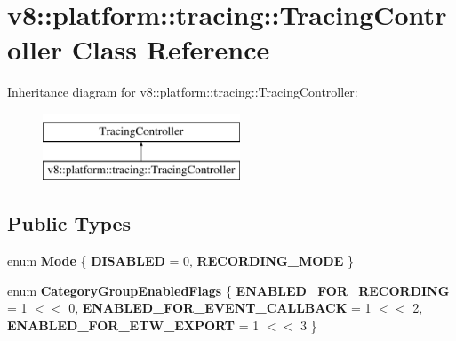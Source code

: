 \hypertarget{classv8_1_1platform_1_1tracing_1_1TracingController}{}\section{v8\+:\+:platform\+:\+:tracing\+:\+:Tracing\+Controller Class Reference}
\label{classv8_1_1platform_1_1tracing_1_1TracingController}
Inheritance diagram for v8\+:\+:platform\+:\+:tracing\+:\+:Tracing\+Controller\+:\begin{figure}[H]
\begin{center}
\leavevmode
\includegraphics[height=2.000000cm]{classv8_1_1platform_1_1tracing_1_1TracingController}
\end{center}
\end{figure}
\subsection*{Public Types}
\begin{DoxyCompactItemize}
\item 
\mbox{\label{classv8_1_1platform_1_1tracing_1_1TracingController_a37479bf3c6274a1e9789938615b64c45}} 
enum {\bfseries Mode} \{ {\bfseries D\+I\+S\+A\+B\+L\+ED} = 0, 
{\bfseries R\+E\+C\+O\+R\+D\+I\+N\+G\+\_\+\+M\+O\+DE}
 \}
\item 
\mbox{\label{classv8_1_1platform_1_1tracing_1_1TracingController_a794d2c176318855f27169e33d4711e16}} 
enum {\bfseries Category\+Group\+Enabled\+Flags} \{ {\bfseries E\+N\+A\+B\+L\+E\+D\+\_\+\+F\+O\+R\+\_\+\+R\+E\+C\+O\+R\+D\+I\+NG} = 1 $<$$<$ 0, 
{\bfseries E\+N\+A\+B\+L\+E\+D\+\_\+\+F\+O\+R\+\_\+\+E\+V\+E\+N\+T\+\_\+\+C\+A\+L\+L\+B\+A\+CK} = 1 $<$$<$ 2, 
{\bfseries E\+N\+A\+B\+L\+E\+D\+\_\+\+F\+O\+R\+\_\+\+E\+T\+W\+\_\+\+E\+X\+P\+O\+RT} = 1 $<$$<$ 3
 \}
\end{DoxyCompactItemize}
